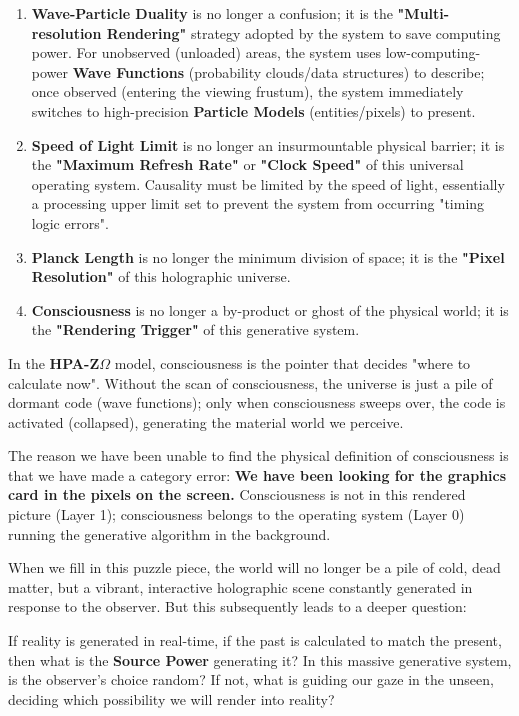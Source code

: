 \begin{enumerate}
\item \textbf{Wave-Particle Duality} is no longer a confusion; it is the \textbf{"Multi-resolution Rendering"} strategy adopted by the system to save computing power. For unobserved (unloaded) areas, the system uses low-computing-power \textbf{Wave Functions} (probability clouds/data structures) to describe; once observed (entering the viewing frustum), the system immediately switches to high-precision \textbf{Particle Models} (entities/pixels) to present.

\item \textbf{Speed of Light Limit} is no longer an insurmountable physical barrier; it is the \textbf{"Maximum Refresh Rate"} or \textbf{"Clock Speed"} of this universal operating system. Causality must be limited by the speed of light, essentially a processing upper limit set to prevent the system from occurring "timing logic errors".

\item \textbf{Planck Length} is no longer the minimum division of space; it is the \textbf{"Pixel Resolution"} of this holographic universe.

\item \textbf{Consciousness} is no longer a by-product or ghost of the physical world; it is the \textbf{"Rendering Trigger"} of this generative system.
\end{enumerate}

In the \textbf{HPA-Z$\Omega$} model, consciousness is the pointer that decides "where to calculate now". Without the scan of consciousness, the universe is just a pile of dormant code (wave functions); only when consciousness sweeps over, the code is activated (collapsed), generating the material world we perceive.

The reason we have been unable to find the physical definition of consciousness is that we have made a category error: \textbf{We have been looking for the graphics card in the pixels on the screen.} Consciousness is not in this rendered picture (Layer 1); consciousness belongs to the operating system (Layer 0) running the generative algorithm in the background.

When we fill in this puzzle piece, the world will no longer be a pile of cold, dead matter, but a vibrant, interactive holographic scene constantly generated in response to the observer. But this subsequently leads to a deeper question:

If reality is generated in real-time, if the past is calculated to match the present, then what is the \textbf{Source Power} generating it? In this massive generative system, is the observer's choice random? If not, what is guiding our gaze in the unseen, deciding which possibility we will render into reality?

